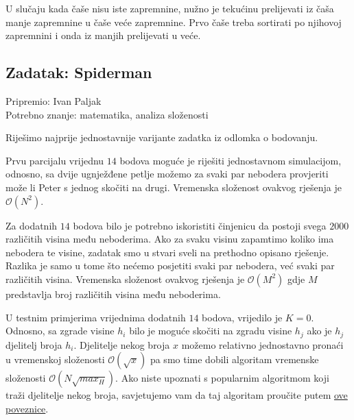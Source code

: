 \documentclass[a4paper]{article}
\begin{document}
U slučaju kada čaše nisu iste zapremnine, nužno je tekućinu prelijevati iz čaša
manje zapremnine u čaše veće zapremnine. Prvo čaše treba sortirati po njihovoj
zapremnini i onda iz manjih prelijevati u veće.

\subsection*{Zadatak: Spiderman}
\textsf{Pripremio: Ivan Paljak}\\
\textsf{Potrebno znanje: matematika, analiza složenosti}

Riješimo najprije jednostavnije varijante zadatka iz odlomka o bodovanju.

Prvu parcijalu vrijednu $14$ bodova moguće je riješiti jednostavnom simulacijom,
odnosno, sa dvije ugnježđene petlje možemo za svaki par nebodera provjeriti
može li Peter s jednog skočiti na drugi. Vremenska složenost ovakvog rješenja
je $\mathcal{O}(N^2)$.

Za dodatnih $14$ bodova bilo je potrebno iskoristiti činjenicu da postoji svega
$2000$ različitih visina među neboderima. Ako za svaku visinu zapamtimo koliko
ima nebodera te visine, zadatak smo u stvari sveli na prethodno opisano
rješenje.  Razlika je samo u tome što nećemo posjetiti svaki par nebodera, već
svaki par različitih visina. Vremenska složenost ovakvog rješenja je
$\mathcal{O}(M^2)$ gdje $M$ predstavlja broj različitih visina među neboderima.

U testnim primjerima vrijednima dodatnih $14$ bodova, vrijedilo je $K = 0$.
Odnosno, sa zgrade visine $h_i$ bilo je moguće skočiti na zgradu visine $h_j$
ako je $h_j$ djelitelj broja $h_i$. Djelitelje nekog broja $x$ možemo relativno
jednostavno pronaći u vremenskoj složenosti $\mathcal{O}(\sqrt{x})$ pa smo time
dobili algoritam vremenske složenosti $\mathcal{O}(N\sqrt{max_H})$. Ako niste
upoznati s popularnim algoritmom koji traži djelitelje nekog broja, savjetujemo
vam da taj algoritam proučite putem
\href{https://www.math.uh.edu/~minru/web/divis2.html}{ove poveznice}.
\end{document}
